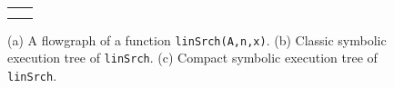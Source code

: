 \documentclass{sig-alternate}%
\begin{document}
\begin{figure}[!htb]
  \begin{tabular}{cc}
    \multicolumn{2}{c}{} \\
    \hspace{-2ex} &
    
  \end{tabular}
\caption{(a) A flowgraph of a function \texttt{linSrch(A,n,x)}.
(b) Classic symbolic execution tree of \texttt{linSrch}. (c) Compact
symbolic execution tree of \texttt{linSrch}.}
\label{fig:linSrch}
\end{figure}
\end{document}
